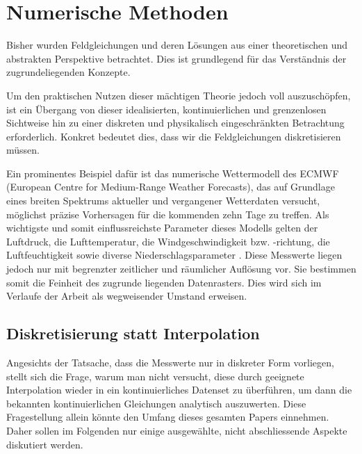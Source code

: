 %
%
%
%
\section{Numerische Methoden}

Bisher wurden Feldgleichungen und deren Lösungen aus einer theoretischen und abstrakten Perspektive betrachtet.
Dies ist grundlegend für das Verständnis der zugrundeliegenden Konzepte.

Um den praktischen Nutzen dieser mächtigen Theorie jedoch voll auszuschöpfen, ist ein Übergang von dieser idealisierten, kontinuierlichen und grenzenlosen Sichtweise hin zu einer diskreten und physikalisch eingeschränkten Betrachtung erforderlich.
Konkret bedeutet dies, dass wir die Feldgleichungen diskretisieren müssen.
%

Ein prominentes Beispiel dafür ist das numerische Wettermodell des ECMWF (European Centre for Medium-Range Weather Forecasts), das auf Grundlage eines breiten Spektrums aktueller und vergangener Wetterdaten versucht, möglichst präzise Vorhersagen für die kommenden zehn Tage zu treffen.
%
Als wichtigste und somit einflussreichste Parameter dieses Modells gelten der Luftdruck, die Lufttemperatur, die Windgeschwindigkeit bzw. -richtung, die Luftfeuchtigkeit sowie diverse Niederschlagsparameter \cite{parallelisierung:ecmwf2023}.
%
%
%
%
Diese Messwerte liegen jedoch nur mit begrenzter zeitlicher und räumlicher Auflösung vor.
Sie bestimmen somit die Feinheit des zugrunde liegenden Datenrasters. Dies wird sich im Verlaufe der Arbeit als wegweisender Umstand erweisen.

\subsection{Diskretisierung statt Interpolation}

Angesichts der Tatsache, dass die Messwerte nur in diskreter Form vorliegen, stellt sich die Frage, warum man nicht versucht, diese durch geeignete Interpolation wieder in ein kontinuierliches Datenset zu überführen, um dann die bekannten kontinuierlichen Gleichungen analytisch auszuwerten.
Diese Fragestellung allein könnte den Umfang dieses gesamten Papers einnehmen.
Daher sollen im Folgenden nur einige ausgewählte, nicht abschliessende Aspekte diskutiert werden.

